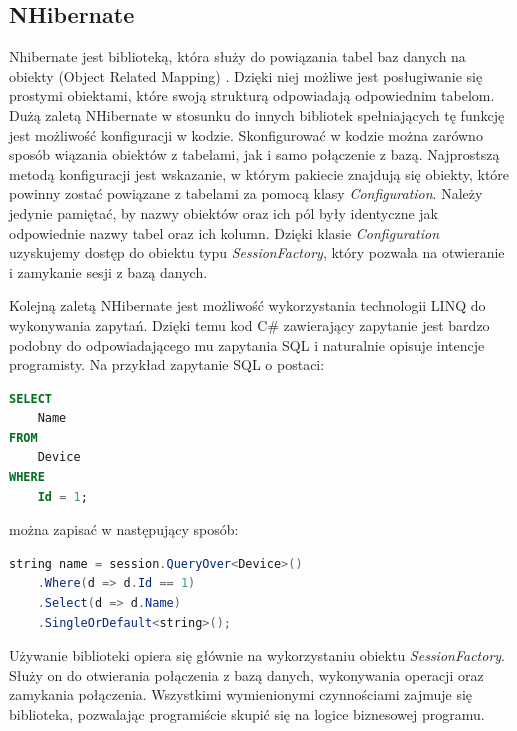 \subsection{NHibernate}
Nhibernate jest biblioteką, która służy do powiązania tabel baz danych na obiekty (Object Related Mapping) \cite{nhibernate-doc}. Dzięki niej możliwe jest posługiwanie się prostymi obiektami, które swoją strukturą odpowiadają odpowiednim tabelom. Dużą zaletą NHibernate w stosunku do innych bibliotek spełniających tę funkcję jest możliwość konfiguracji w kodzie. Skonfigurować w kodzie można zarówno sposób wiązania obiektów z tabelami, jak i samo połączenie z bazą. Najprostszą metodą konfiguracji jest wskazanie, w którym pakiecie znajdują się obiekty, które powinny zostać powiązane z tabelami za pomocą klasy \textit{Configuration}. Należy jedynie pamiętać, by nazwy obiektów oraz ich pól były identyczne jak odpowiednie nazwy tabel oraz ich kolumn. Dzięki klasie \textit{Configuration} uzyskujemy dostęp do obiektu typu \textit{SessionFactory}, który pozwala na otwieranie i zamykanie sesji z bazą danych. 

Kolejną zaletą NHibernate jest możliwość wykorzystania technologii LINQ do wykonywania zapytań. Dzięki temu kod C\# zawierający zapytanie jest bardzo podobny do odpowiadającego mu zapytania SQL i naturalnie opisuje intencje programisty. Na przykład zapytanie SQL o postaci:
\begin{lstlisting}[language=SQL]
SELECT
    Name
FROM
    Device
WHERE
    Id = 1;
\end{lstlisting}
można zapisać w następujący sposób:
\begin{lstlisting}[language=Java]
string name = session.QueryOver<Device>()
    .Where(d => d.Id == 1)
    .Select(d => d.Name)
    .SingleOrDefault<string>();
\end{lstlisting}
Używanie biblioteki opiera się głównie na wykorzystaniu obiektu \textit{SessionFactory}. Służy on do otwierania połączenia z bazą danych, wykonywania operacji oraz zamykania połączenia. Wszystkimi wymienionymi czynnościami zajmuje się biblioteka, pozwalając programiście skupić się na logice biznesowej programu.

